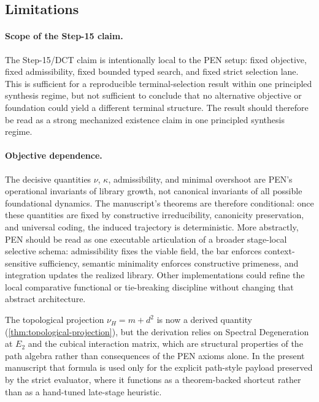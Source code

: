 \documentclass[11pt,a4paper]{article}
\theoremstyle{plain}
\theoremstyle{definition}
\theoremstyle{remark}
\begin{document}
\subsection{Limitations}

\paragraph{Scope of the Step-15 claim.}
The Step-15/DCT claim is intentionally local to the PEN setup: fixed objective, fixed admissibility, fixed bounded typed search, and fixed strict selection lane.
This is sufficient for a reproducible terminal-selection result within one principled synthesis regime, but not sufficient to conclude that no alternative objective or foundation could yield a different terminal structure.
The result should therefore be read as a strong mechanized existence claim in one principled synthesis regime.

\paragraph{Objective dependence.}
The decisive quantities $\nu$, $\kappa$, admissibility, and minimal overshoot are PEN's operational invariants of library growth, not canonical invariants of all possible foundational dynamics.
The manuscript's theorems are therefore conditional: once these quantities are fixed by constructive irreducibility, canonicity preservation, and universal coding, the induced trajectory is deterministic.
More abstractly, PEN should be read as one executable articulation of a broader stage-local selective schema: admissibility fixes the viable field, the bar enforces context-sensitive sufficiency, semantic minimality enforces constructive primeness, and integration updates the realized library. Other implementations could refine the local comparative functional or tie-breaking discipline without changing that abstract architecture.

The topological projection $\nu_H = m + d^2$ is now a derived quantity (\cref{thm:topological-projection}), but the derivation relies on Spectral Degeneration at $E_2$ and the cubical interaction matrix, which are structural properties of the path algebra rather than consequences of the PEN axioms alone.
In the present manuscript that formula is used only for the explicit path-style payload preserved by the strict evaluator, where it functions as a theorem-backed shortcut rather than as a hand-tuned late-stage heuristic.
\end{document}
